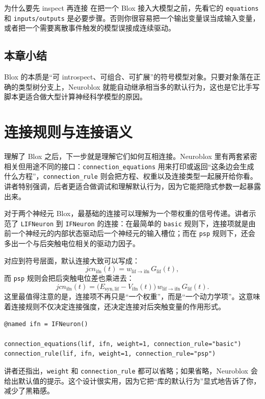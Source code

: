 \documentclass[a4paper]{article}
\begin{document}
\begin{importantbox}{为什么要先 inspect 再连接}
在把一个 Blox 接入大模型之前，先看它的 \texttt{equations} 和 \texttt{inputs/outputs} 是必要步骤。否则你很容易把一个输出变量误当成输入变量，或者把一个需要离散事件触发的模型误接成连续驱动。
\end{importantbox}

\subsection{本章小结}
Blox 的本质是“可 introspect、可组合、可扩展”的符号模型对象。只要对象落在正确的类型树分支上，Neuroblox 就能自动继承相当多的默认行为，这也是它比手写脚本更适合做大型计算神经科学模型的原因。

\section{连接规则与连接语义}
理解了 Blox 之后，下一步就是理解它们如何互相连接。Neuroblox 里有两套紧密相关但用途不同的接口：\texttt{connection\_equations} 用来打印或返回“这条边会生成什么方程”，\texttt{connection\_rule} 则会把方程、权重以及连接类型一起展开给你看。讲者特别强调，后者更适合做调试和理解默认行为，因为它能把隐式参数一起暴露出来。

对于两个神经元 Blox，最基础的连接可以理解为一个带权重的信号传递。讲者示范了 \texttt{LIFNeuron} 到 \texttt{IFNeuron} 的连接：在最简单的 \texttt{basic} 规则下，连接项就是由前一个神经元的内部状态驱动后一个神经元的输入槽位；而在 \texttt{psp} 规则下，还会多出一个与后突触电位相关的驱动力因子。

对应到符号层面，默认连接大致可以写成：
\[
jcn_{\mathrm{ifn}}(t) = w_{\mathrm{lif}\to\mathrm{ifn}}\,G_{\mathrm{lif}}(t),
\]
而 \texttt{psp} 规则会把后突触电位差也乘进去：
\[
jcn_{\mathrm{ifn}}(t)
= \bigl(E_{\mathrm{syn,lif}} - V_{\mathrm{ifn}}(t)\bigr)
\,w_{\mathrm{lif}\to\mathrm{ifn}}\,G_{\mathrm{lif}}(t).
\]
这里最值得注意的是，连接项不再只是“一个权重”，而是“一个动力学项”。这意味着连接规则不仅决定连接强度，还决定连接对后突触变量的作用形式。

\begin{lstlisting}[caption={查看两种默认连接语义}]
@named ifn = IFNeuron()

connection_equations(lif, ifn, weight=1, connection_rule="basic")
connection_rule(lif, ifn, weight=1, connection_rule="psp")
\end{lstlisting}

讲者还指出，\texttt{weight} 和 \texttt{connection\_rule} 都可以省略；如果省略，Neuroblox 会给出默认值的提示。这个设计很实用，因为它把“库的默认行为”显式地告诉了你，减少了黑箱感。
\end{document}
